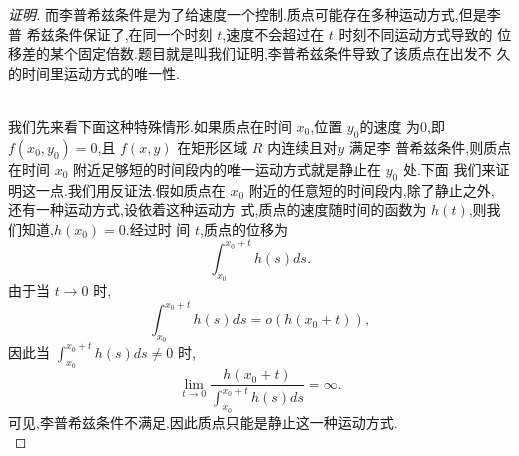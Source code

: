\documentclass[a4paper, 12pt]{article} %
\begin{document}
\begin{CJK}{UTF8}{gkai}
\begin{proof}[证明]
  而李普希兹条件是为了给速度一个控制.质点可能存在多种运动方式,但是李普
  希兹条件保证了,在同一个时刻 $t$,速度不会超过在 $t$ 时刻不同运动方式导致的
  位移差的某个固定倍数.题目就是叫我们证明,李普希兹条件导致了该质点在出发不
  久的时间里运动方式的唯一性.\\\\
\begin{comment}
  我们先来探索一些情形.如果质点速度连续.在时间 $x_0$ 的时候位于位
  置 $y_0$,且此时的速度为$f(x_0,y_0)$,且之后质点受到变力 $F(t)$ 的作用,我
  们知道,经历时间 $t$ 后,质点的速度为
$$
\int_{0}^{t}\frac{F(s)}{m}+f(x_0,y_{0})ds.
$$
其中 $m$ 是质点的质量.因此,经历时间 $t$ 后,质点的位移为
$$
\int_{0}^{t}\left(\int_0^r \frac{F(s)}{m}ds+f(x_0,y_0)r\right)dr.
$$
同理,如果质点受到的力的作用是 $G(t)$,则经过时间 $t$ 后,质点的位移为
$$
\int_{0}^{t}\left(\int_0^r \frac{G(s)}{m}ds+f(x_0,y_0)r\right)dr.
$$
因此两种运动方式在经过时间 $t$ 后导致的位移差为
\begin{align*}
  &\int_{0}^{t}\left(\int_0^r
    \frac{F(s)}{m}ds+f(x_0,y_0)r\right)dr-\int_{0}^{t}\left(\int_0^r
    \frac{G(s)}{m}ds+f(x_0,y_0)r\right)dr\\&=\int_0^t\left(\int_0^{r}\frac{F(s)-G(s)}{m}ds\right)dr.
\end{align*}
如果 $F(t)$ 是恒力 $Q_1$,$G(t)$ 是和 $F(t)$ 不相等的另一个恒力 $Q_2$,下
面我们来看
$$
\frac{\int_0^{t}\frac{F(s)-G(s)}{m}ds}{\int_0^t\left(\int_0^{r}\frac{F(s)-G(s)}{m}ds\right)dr}
$$
上式化简为
$$
\frac{\frac{t}{m}(Q_1-Q_2)}{\frac{1}{2}\frac{t^{2}}{m}(Q_1-Q_2)}
$$
此时,当 $t\to 0$ 时,显然不满足李普希兹条件.\\
\end{comment}
我们先来看下面这种特殊情形.如果质点在时间 $x_0$,位置 $y_0$的速度
为0,即 $f(x_0,y_0)=0$,且 $f(x,y)$ 在矩形区域 $R$ 内连续且对$y$ 满足李
普希兹条件,则质点在时间 $x_0$ 附近足够短的时间段内的唯一运动方式就是静止在 $y_0$ 处.下面
我们来证明这一点.我们用反证法.假如质点在 $x_0$ 附近的任意短的时间段内,除了静止之外,
还有一种运动方式,设依着这种运动方
式,质点的速度随时间的函数为 $h(t)$,则我们知道,$h(x_0)=0$.经过时
间 $t$,质点的位移为
$$
\int_{x_{0}}^{x_0+t}h(s)ds.
$$
由于当 $t\to 0$ 时,
$$
\int_{x_0}^{x_0+t}h(s)ds=o(h(x_0+t)),
$$
因此当 $\int_{x_0}^{x_0+t}h(s)ds\neq 0$ 时,
$$
\lim_{t\to 0}\frac{h(x_0+t)}{\int_{x_{0}}^{x_0+t}h(s)ds}=\infty.
$$
可见,李普希兹条件不满足.因此质点只能是静止这一种运动方式.\\


\end{proof}
\end{CJK}
\end{document}
